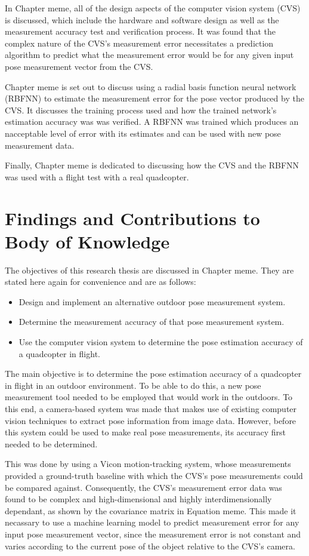 In Chapter meme, all of the design aspects of the computer vision system (CVS) is discussed, which include the hardware and software design as well as the measurement accuracy test and verification process. It was found that the complex nature of the CVS's measurement error necessitates a prediction algorithm to predict what the measurement error would be for any given input pose measurement vector from the CVS. 

Chapter meme is set out to discuss using a radial basis function neural network (RBFNN) to estimate the measurement error for the pose vector produced by the CVS. It discusses the training process used and how the trained network's estimation accuracy was was verified. A RBFNN was trained which produces an nacceptable level of error with its estimates and can be used with new pose measurement data.

Finally, Chapter meme is dedicated to discussing how the CVS and the RBFNN was used with a flight test with a real quadcopter.

\section{Findings and Contributions to Body of Knowledge}

The objectives of this research thesis are discussed in Chapter meme. They are stated here again for convenience and are as follows:

\begin{itemize}
  \item Design and implement an alternative outdoor pose measurement system.
  \item Determine the measurement accuracy of that pose measurement system.
  \item Use the computer vision system to determine the pose estimation accuracy of a quadcopter in flight. 
\end{itemize}

The main objective is to determine the pose estimation accuracy of a quadcopter in flight in an outdoor environment. To be able to do this, a new pose measurement tool needed to be employed that would work in the outdoors. To this end, a camera-based system was made that makes use of existing computer vision techniques to extract pose information from image data. However, before this system could be used to make real pose measurements, its accuracy first needed to be determined.

This was done by using a Vicon motion-tracking system, whose measurements provided a ground-truth baseline with which the CVS's pose measurements could be compared against. Consequently, the CVS's measurement error data was found to be complex and high-dimensional and highly interdimensionally dependant, as shown by the covariance matrix in Equation meme. This made it necassary to use a machine learning model to predict measurement error for any input pose measurement vector, since the measurement error is not constant and varies according to the current pose of the object relative to the CVS's camera. 

